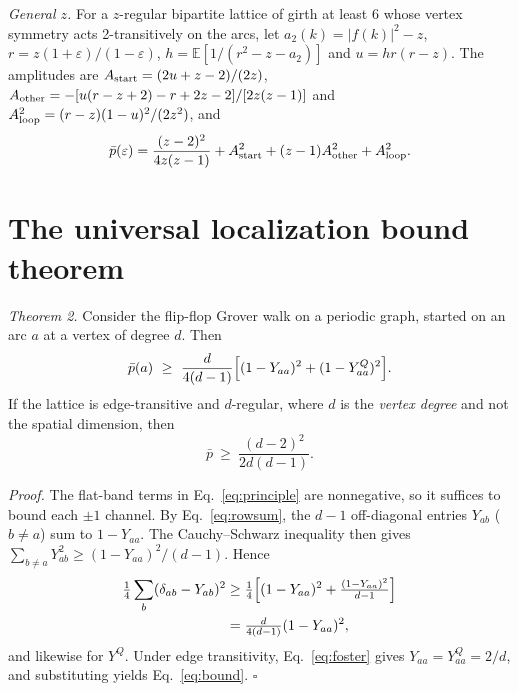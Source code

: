 \documentclass[aps,pra,10pt,twocolumn,superscriptaddress,nofootinbib]{revtex4-2}
\newcommand{\E}{\mathbb{E}}
\newcommand{\pbar}{\bar{p}}
\newcommand{\YQ}{Y^{Q}}
\begin{document}
\emph{General $z$.} For a $z$-regular bipartite lattice of girth at least 6 whose vertex symmetry acts
2-transitively on the arcs, let $a_2(k)=|f(k)|^2-z$, $r=z(1+\varepsilon)/(1-\varepsilon)$,
$h=\E[1/(r^2-z-a_2)]$ and $u=hr(r-z)$. The amplitudes are
$A_{\rm start}=(2u+z-2)/(2z)$,
$A_{\rm other}=-[u(r-z+2)-r+2z-2]/[2z(z-1)]$ and
$A_{\rm loop}^2=(r-z)(1-u)^2/(2z^2)$, and
\begin{equation}
\pbar(\varepsilon)=\frac{(z-2)^2}{4z(z-1)}+A_{\rm start}^2+(z-1)A_{\rm other}^2+A_{\rm loop}^2 .
\end{equation}

\section{The universal localization bound theorem}
\label{sec:bound}

\emph{Theorem 2.} Consider the flip-flop Grover walk on a periodic graph, started on an arc $a$
at a vertex of degree $d$. Then
\begin{equation}
\pbar(a)\ \ge\ \frac{d}{4(d-1)}\Bigl[(1-Y_{aa})^2+(1-\YQ_{aa})^2\Bigr].
\label{eq:bound-general}
\end{equation}
If the lattice is edge-transitive and $d$-regular, where $d$ is the \emph{vertex degree}
and not the spatial dimension, then
\begin{equation}
\pbar\ \ge\ \frac{(d-2)^2}{2d(d-1)} .
\label{eq:bound}
\end{equation}

\emph{Proof.} The flat-band terms in Eq.~\eqref{eq:principle} are nonnegative, so it
suffices to bound each $\pm1$ channel. By Eq.~\eqref{eq:rowsum}, the $d-1$ off-diagonal
entries $Y_{ab}$ ($b\ne a$) sum to $1-Y_{aa}$. The Cauchy--Schwarz inequality then gives
$\sum_{b\ne a}Y_{ab}^2\ge(1-Y_{aa})^2/(d-1)$. Hence
\begin{align}
\tfrac14\sum_b(\delta_{ab}-Y_{ab})^2
&\ge\tfrac14\Bigl[(1-Y_{aa})^2+\tfrac{(1-Y_{aa})^2}{d-1}\Bigr]\nonumber\\
&=\tfrac{d}{4(d-1)}(1-Y_{aa})^2,
\end{align}
and likewise for $\YQ$. Under edge transitivity, Eq.~\eqref{eq:foster} gives $Y_{aa}=\YQ_{aa}=2/d$,
and substituting yields Eq.~\eqref{eq:bound}. $\square$
\end{document}
